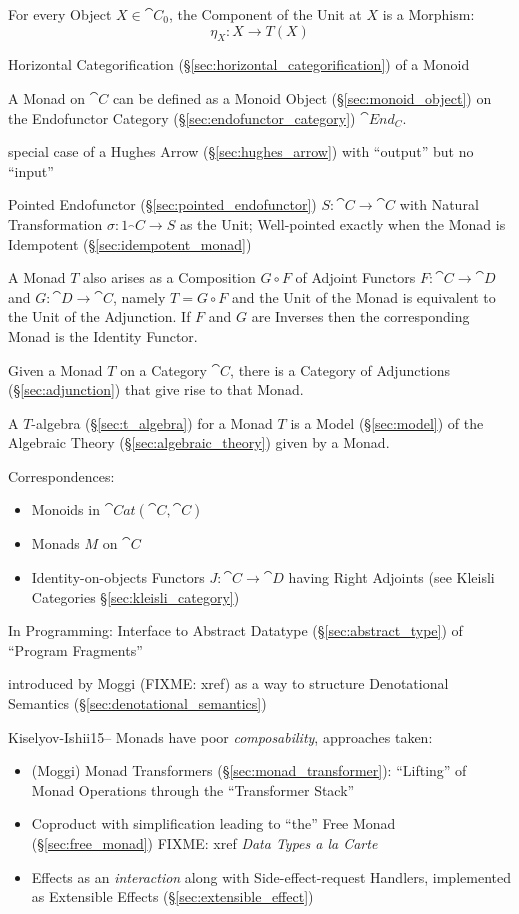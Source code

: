 For every Object $X \in \cat{C}_0$, the Component of the Unit at $X$
is a Morphism:
\[
  \eta_X : X \rightarrow T (X)
\]

Horizontal Categorification (\S\ref{sec:horizontal_categorification})
of a Monoid

A Monad on $\cat{C}$ can be defined as a Monoid Object
(\S\ref{sec:monoid_object}) on the Endofunctor Category
(\S\ref{sec:endofunctor_category}) $\cat{End_C}$.

special case of a Hughes Arrow (\S\ref{sec:hughes_arrow}) with
``output'' but no ``input''

Pointed Endofunctor (\S\ref{sec:pointed_endofunctor}) $S : \cat{C}
\rightarrow \cat{C}$ with Natural Transformation $\sigma : 1_\cat{C}
\rightarrow S$ as the Unit; Well-pointed exactly when the Monad is
Idempotent (\S\ref{sec:idempotent_monad})

A Monad $T$ also arises as a Composition $G \circ F$ of Adjoint
Functors $F : \cat{C} \rightarrow \cat{D}$ and $G : \cat{D}
\rightarrow \cat{C}$, namely $T = G \circ F$ and the Unit of the Monad
is equivalent to the Unit of the Adjunction. If $F$ and $G$ are
Inverses then the corresponding Monad is the Identity Functor.

Given a Monad $T$ on a Category $\cat{C}$, there is a Category of
Adjunctions (\S\ref{sec:adjunction}) that give rise to that Monad.

A $T$-algebra (\S\ref{sec:t_algebra}) for a Monad $T$ is a Model
(\S\ref{sec:model}) of the Algebraic Theory
(\S\ref{sec:algebraic_theory}) given by a Monad.

Correspondences: \cite{jacobs-heunen-hasuo09}
\begin{itemize}
\item Monoids in $\cat{Cat}(\cat{C},\cat{C})$
\item Monads $M$ on $\cat{C}$
\item Identity-on-objects Functors $J : \cat{C} \rightarrow \cat{D}$
  having Right Adjoints (see Kleisli Categories
  \S\ref{sec:kleisli_category})
\end{itemize}

In Programming: Interface to Abstract Datatype
(\S\ref{sec:abstract_type}) of ``Program Fragments''

introduced by Moggi (FIXME: xref) as a way to structure Denotational Semantics
(\S\ref{sec:denotational_semantics})

Kiselyov-Ishii15-- Monads have poor \emph{composability}, approaches taken:
\begin{itemize}
  \item (Moggi) Monad Transformers (\S\ref{sec:monad_transformer}): ``Lifting''
    of Monad Operations through the ``Transformer Stack''
  \item Coproduct with simplification leading to ``the'' Free Monad
    (\S\ref{sec:free_monad}) FIXME: xref \emph{Data Types a la Carte}
  \item Effects as an \emph{interaction} along with Side-effect-request
    Handlers, implemented as Extensible Effects (\S\ref{sec:extensible_effect})
\end{itemize}

